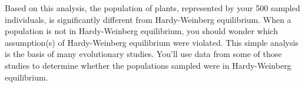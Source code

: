 \documentclass[12pt]{exam}
\begin{document}
\begin{questions}
Based on this analysis, the population of plants, represented by your 500 sampled individuals, is significantly different from Hardy-Weinberg equilibrium. When a population is not in Hardy-Weinberg equilibrium, you should wonder which assumption(s) of Hardy-Weinberg equilibrium were violated. This simple analysis is the basis of many evolutionary studies. You’ll use data from some of those studies to determine whether the populations sampled were in Hardy-Weinberg equilibrium.
\vspace{\baselineskip}

\end{questions}
\end{document}
